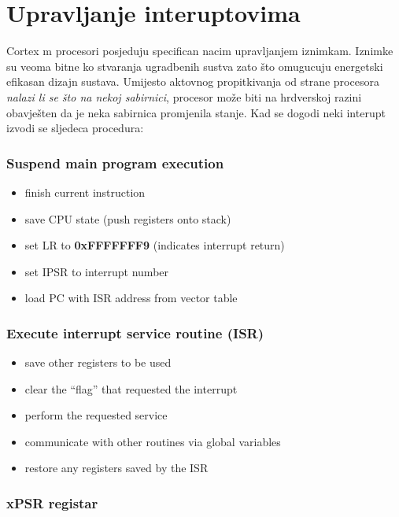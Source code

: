 \documentclass[times, utf8, diplomski]{fer}
\begin{document}
\section{Upravljanje interuptovima}
Cortex m procesori posjeduju specifican nacim upravljanjem iznimkam. Iznimke su veoma bitne ko stvaranja ugradbenih sustva zato \v{s}to omugucuju energetski efikasan dizajn sustava.
Umijesto aktovnog propitkivanja od strane procesora \textit{nalazi li se \v{s}to na nekoj sabirnici}, procesor mo\v{z}e biti na hrdverskoj razini obavje\v{s}ten da je neka sabirnica
promjenila stanje.
Kad se dogodi neki interupt izvodi se sljedeca procedura:

\subsubsection{Suspend main program execution}
\begin{itemize}
  \item finish current instruction
  \item save CPU state (push registers onto stack)
  \item set LR to \textbf{0xFFFFFFF9} (indicates interrupt return)
  \item set IPSR to interrupt number
  \item load PC with ISR address from vector table
\end{itemize}

\subsubsection{Execute interrupt service routine (ISR)}
\begin{itemize}
  \item save other registers to be used
  \item clear the “flag” that requested the interrupt
  \item perform the requested service
  \item communicate with other routines via global variables
  \item restore any registers saved by the ISR
\end{itemize}

\subsubsection{xPSR registar}
\end{document}

